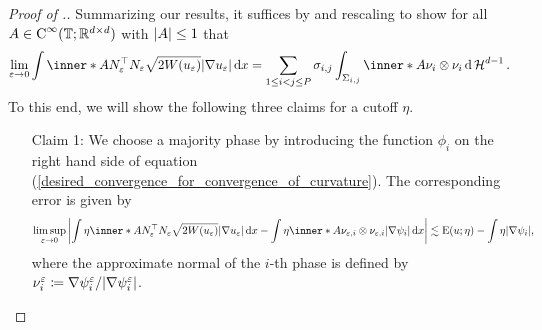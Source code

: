 \begin{proof}[Proof of .]
	Summarizing our results, it suffices by  and rescaling to show for all $ A \in \operatorname{C}^{ \infty } ( \operatorname{\mathbb{T}} ; \mathbb{ R }^{ d \times d } ) $ with $ \abs{ A } \leq 1 $ that
	\begin{equation}
		\label{desired_convergence_for_convergence_of_curvature}
		\lim_{ \varepsilon \to 0 }
			\int
				\inner*{ A }{ N_{ \varepsilon }^{ \top } N_{ \varepsilon } }
				\sqrt{ 2 W ( u_{ \varepsilon } ) }
				\abs{ \nabla u_{ \varepsilon } }
			\dd{ x }
		=
		\sum_{ 1 \leq i < j \leq P }
			\sigma_{ i , j }
			\int_{ \Sigma_{ i , j } }
				\inner*{ A }{ \nu_{ i } \otimes \nu_{ i } }
			\dd{ \hm^{ d - 1 } }.
	\end{equation}
	To this end, we will show the following three claims for a cutoff $ \eta $.
	\begin{itemize}[wide=0pt]
		\item[Claim 1:]
		We choose a majority phase by introducing the function $ \phi_{ i } $ on the right hand side of equation (\ref{desired_convergence_for_convergence_of_curvature}). The corresponding error is given by
		\begin{equation*}
			\limsup_{ \varepsilon \to 0 }
				\abs{ 
					\int
						\eta 
						\inner*{ A }{ N_{ \varepsilon }^{ \top } N_{ \varepsilon } }
						\sqrt{ 2 W ( u_{ \varepsilon } ) } \abs{ \nabla u_{ \varepsilon } } 
					\dd{ x }
					-
					\int
						\eta
						\inner*{ A }{ \nu_{ \varepsilon, i } \otimes \nu_{ 
						\varepsilon , i } }
						\abs{ \nabla \psi_{ i } }
					\dd{ x }
				}
			\lesssim
				\energy ( u ; \eta ) 
				-
				\int
					\eta
				\abs{ \nabla \psi_{ i } },
		\end{equation*}
		where the approximate normal of the $ i$-th phase is defined by $ \nu_{ i }^{ \varepsilon } \coloneqq \nabla \psi_{ i }^{ \varepsilon } / \abs{ \nabla \psi_{ i }^{ \varepsilon } } $.
		

\end{itemize}
\end{proof}

